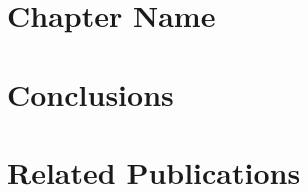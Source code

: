 \documentclass[11pt]{book}
\begin{document}
\chapter{Chapter Name}
\label{ch:chap4}


\chapter{Conclusions}
\label{ch:conc}



\chapter*{Related Publications}
\label{ch:relatedPubs}




 
\end{document}
